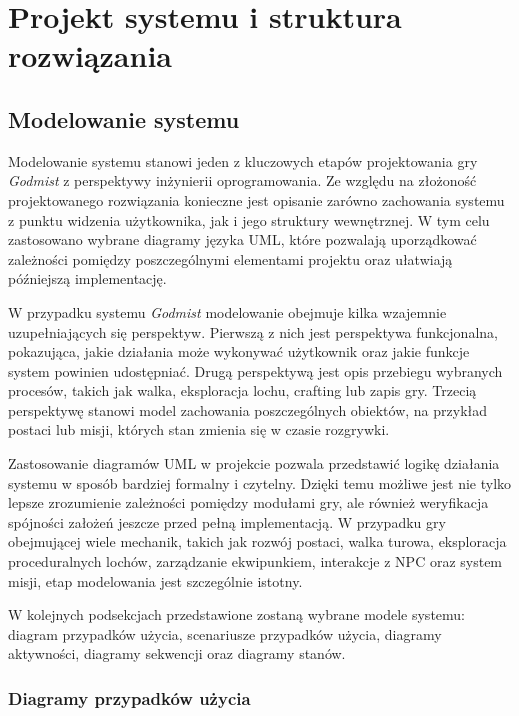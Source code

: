 \chapter{Projekt systemu i struktura rozwiązania}
\label{cha:projekt-systemu}

\section{Modelowanie systemu}
\label{sec:modelowanie-systemu}

Modelowanie systemu stanowi jeden z kluczowych etapów projektowania gry \emph{Godmist} z perspektywy inżynierii oprogramowania. Ze względu na złożoność projektowanego rozwiązania konieczne jest opisanie zarówno zachowania systemu z punktu widzenia użytkownika, jak i jego struktury wewnętrznej. W tym celu zastosowano wybrane diagramy języka UML, które pozwalają uporządkować zależności pomiędzy poszczególnymi elementami projektu oraz ułatwiają późniejszą implementację.

W przypadku systemu \emph{Godmist} modelowanie obejmuje kilka wzajemnie uzupełniających się perspektyw. Pierwszą z nich jest perspektywa funkcjonalna, pokazująca, jakie działania może wykonywać użytkownik oraz jakie funkcje system powinien udostępniać. Drugą perspektywą jest opis przebiegu wybranych procesów, takich jak walka, eksploracja lochu, crafting lub zapis gry. Trzecią perspektywę stanowi model zachowania poszczególnych obiektów, na przykład postaci lub misji, których stan zmienia się w czasie rozgrywki.

Zastosowanie diagramów UML w projekcie pozwala przedstawić logikę działania systemu w sposób bardziej formalny i czytelny. Dzięki temu możliwe jest nie tylko lepsze zrozumienie zależności pomiędzy modułami gry, ale również weryfikacja spójności założeń jeszcze przed pełną implementacją. W przypadku gry obejmującej wiele mechanik, takich jak rozwój postaci, walka turowa, eksploracja proceduralnych lochów, zarządzanie ekwipunkiem, interakcje z NPC oraz system misji, etap modelowania jest szczególnie istotny.

W kolejnych podsekcjach przedstawione zostaną wybrane modele systemu: diagram przypadków użycia, scenariusze przypadków użycia, diagramy aktywności, diagramy sekwencji oraz diagramy stanów.

\subsection{Diagramy przypadków użycia}

